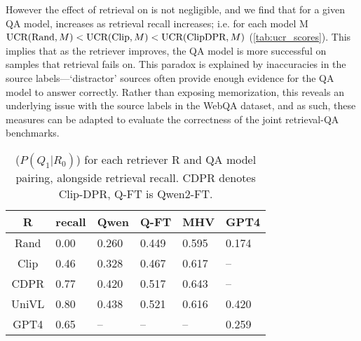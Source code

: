 However the effect of retrieval on \UCR is not negligible, and we find that for a given QA model, \UCR increases as retrieval recall increases; i.e. for each model M $\text{UCR}(\text{Rand}, M)<\text{UCR}(\text{Clip}, M)<\text{UCR}(\text{ClipDPR}, M)$ (\autoref{tab:ucr_scores}). This implies that as the retriever improves, the QA model is more successful on samples that retrieval fails on. This paradox is explained by inaccuracies in the source labels---`distractor' sources often provide enough evidence for the QA model to answer correctly. Rather than exposing memorization, this reveals an underlying issue with the source labels in the WebQA dataset, and as such, these measures can be adapted to evaluate the correctness of the joint retrieval-QA benchmarks.


\begin{table}[!t]
\centering
\caption{\UCR ($P(Q_1|R_0)$) for each retriever R and QA model pairing, alongside retrieval recall. CDPR denotes Clip-DPR, Q-FT is Qwen2-FT.}
\label{tab:ucr_scores}
\begin{tabular}{clllll}
\toprule
R & recall & Qwen & Q-FT & MHV & GPT4 \\ %
\midrule
Rand & 0.00 & 0.260 & 0.449 & 0.595 & 0.174 \\
Clip & 0.46 & 0.328 & 0.467 & 0.617 & -- \\
CDPR & 0.77 & 0.420 & 0.517 & 0.643 & -- \\
UniVL & 0.80 & 0.438 & 0.521 & 0.616 & 0.420 \\
GPT4 & 0.65 & -- & -- & -- & 0.259 \\
\bottomrule
\end{tabular}
\end{table}

